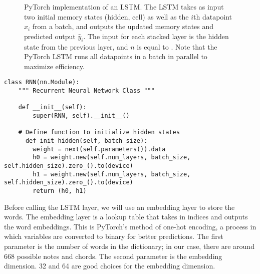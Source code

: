 \begin{figure}[H]

  \caption{PyTorch implementation of an LSTM.
          The LSTM takes as input two initial memory states (hidden, cell) as well as the $i$th datapoint $x_i$ from a batch, and outputs the updated memory states and predicted output $\hat{y}_i$.
          The input for each stacked layer is the hidden state from the previous layer, and $n$ is equal to .
          Note that the PyTorch LSTM runs all datapoints in a batch in parallel to maximize efficiency.
          }
  \label{figure:lstm}
\end{figure}

\begin{lstlisting}
class RNN(nn.Module):
    """ Recurrent Neural Network Class """

    def __init__(self):
        super(RNN, self).__init__() 
      
    # Define function to initialize hidden states
	  def init_hidden(self, batch_size):
        weight = next(self.parameters()).data
        h0 = weight.new(self.num_layers, batch_size, self.hidden_size).zero_().to(device)
        h1 = weight.new(self.num_layers, batch_size, self.hidden_size).zero_().to(device)
        return (h0, h1)

\end{lstlisting}

Before calling the LSTM layer, we will use an embedding layer to store the words.
The embedding layer is a lookup table that takes in indices and outputs the word embeddings.
This is PyTorch's method of one-hot encoding, a process in which variables are converted to binary for better predictions.
The first parameter is the number of words in the dictionary; in our case, there are around 668 possible notes and chords. %
The second parameter is the embedding dimension.
32 and 64 are good choices for the embedding dimension.

